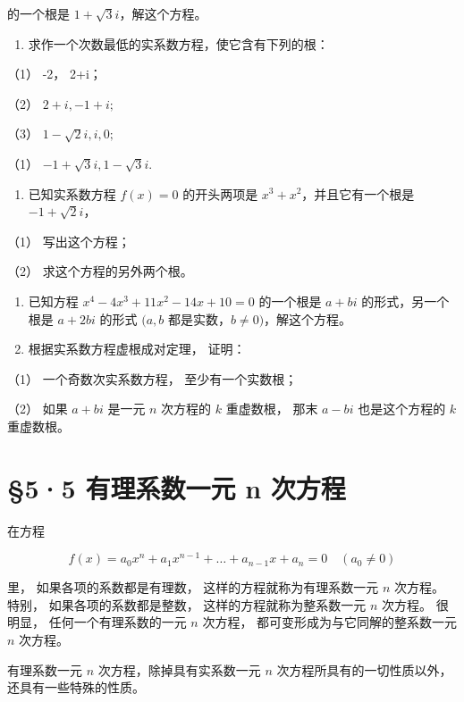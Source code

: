 的一个根是 \(1 + \sqrt{3} i\)，解这个方程。

\begin{enumerate}[start=2]
\item
  求作一个次数最低的实系数方程，使它含有下列的根：
\end{enumerate}

（1） -2， 2+i；

（2） \(2 + i, -1 + i;\)

（3） \(1 - \sqrt{2} i, i, 0;\)

（1） \(-1 + \sqrt{3} i, 1 - \sqrt{3} i.\)

\begin{enumerate}[start=3]
\item
  已知实系数方程 \(f(x) = 0\) 的开头两项是
  \(x^3 + x^2\)，并且它有一个根是 \(-1 + \sqrt{2}i\)，
\end{enumerate}

（1） 写出这个方程；

（2） 求这个方程的另外两个根。

\begin{enumerate}[start=4]
\item
  已知方程 \(x^4 - 4x^3 + 11x^2 - 14x + 10 = 0\) 的一个根是 \(a + bi\)
  的形式，另一个根是 \(a + 2bi\) 的形式 \((a, b\)
  都是实数，\(b \neq 0)\)，解这个方程。
\item
  根据实系数方程虚根成对定理， 证明：
\end{enumerate}

（1） 一个奇数次实系数方程， 至少有一个实数根；

（2） 如果 \(a + bi\) 是一元 \(n\) 次方程的 \(k\) 重虚数根， 那末
\(a - bi\) 也是这个方程的 \(k\) 重虚数根。

\section{§5·5 有理系数一元 n 次方程}

在方程

\[
f (x) = a _ {0} x ^ {n} + a _ {1} x ^ {n - 1} + \dots + a _ {n - 1} x + a _ {n} = 0 \quad (a _ {0} \neq 0)
\]

里， 如果各项的系数都是有理数， 这样的方程就称为有理系数一元 \(n\)
次方程。 特别， 如果各项的系数都是整数， 这样的方程就称为整系数一元
\(n\) 次方程。 很明显， 任何一个有理系数的一元 \(n\) 次方程，
都可变形成为与它同解的整系数一元 \(n\) 次方程。

有理系数一元 \(n\) 次方程，除掉具有实系数一元 \(n\)
次方程所具有的一切性质以外，还具有一些特殊的性质。

